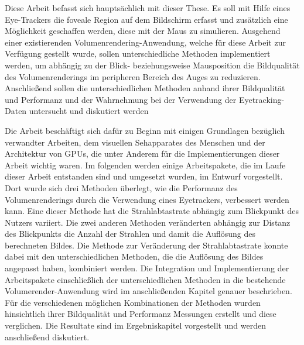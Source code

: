 Diese Arbeit befasst sich hauptsächlich mit dieser These.
Es soll mit Hilfe eines Eye-Trackers die foveale Region auf dem Bildschirm erfasst und zusätzlich eine Möglichkeit geschaffen werden, diese mit der Maus zu simulieren.
Ausgehend einer existierenden Volumenrendering-Anwendung, welche für diese Arbeit zur Verfügung gestellt wurde, sollen unterschiedliche Methoden implementiert werden, um abhängig zu der Blick- beziehungsweise Mausposition die Bildqualität des Volumenrenderings im peripheren Bereich des Auges zu reduzieren.
Anschließend sollen die unterschiedlichen Methoden anhand ihrer Bildqualität und Performanz und der Wahrnehmung bei der Verwendung der Eyetracking-Daten untersucht und diskutiert werden

Die Arbeit beschäftigt sich dafür zu Beginn mit einigen Grundlagen bezüglich verwandter Arbeiten, dem visuellen Sehapparates des Menschen und der Architektur von GPUs, die unter Anderem für die Implementierungen dieser Arbeit wichtig waren.
Im folgenden werden einige Arbeitspakete, die im Laufe dieser Arbeit entstanden sind und umgesetzt wurden, im Entwurf vorgestellt.
Dort wurde sich drei Methoden überlegt, wie die Performanz des Volumenrenderings durch die Verwendung eines Eyetrackers, verbessert werden kann.
Eine dieser Methode hat die Strahlabtastrate abhängig zum Blickpunkt des Nutzers variiert.
Die zwei anderen Methoden veränderten abhängig zur Distanz des Blickpunkts die Anzahl der Strahlen und damit die Auflösung des berechneten Bildes.
Die Methode zur Veränderung der Strahlabtastrate konnte dabei mit den unterschiedlichen Methoden, die die Auflösung des Bildes angepasst haben, kombiniert werden.
Die Integration und Implementierung der Arbeitspakete einschließlich der unterschiedlichen Methoden in die bestehende Volumerender-Anwendung wird im anschließenden Kapitel genauer beschrieben.
Für die verschiedenen möglichen Kombinationen der Methoden wurden hinsichtlich ihrer Bildqualität und Performanz Messungen erstellt und diese verglichen.
Die Resultate sind im Ergebniskapitel vorgestellt und werden anschließend diskutiert.